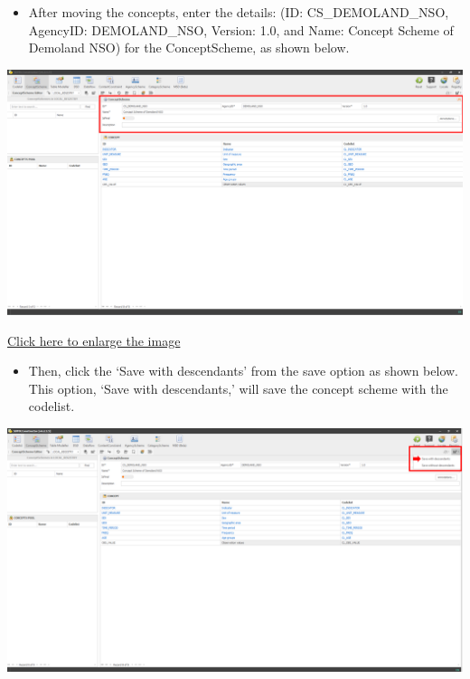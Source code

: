 \documentclass[
]{book}
\providecommand{\tightlist}{%
  \setlength{\itemsep}{0pt}\setlength{\parskip}{0pt}}
\begin{document}
\begin{itemize}
\tightlist
\item
  After moving the concepts, enter the details: (ID: CS\_DEMOLAND\_NSO, AgencyID: DEMOLAND\_NSO, Version: 1.0, and Name: Concept Scheme of Demoland NSO) for the ConceptScheme, as shown below.
\end{itemize}

\begin{center}\includegraphics[width=1\linewidth]{./images/image116} \end{center}

\href{images/image116.png}{Click here to enlarge the image}

\begin{itemize}
\tightlist
\item
  Then, click the `Save with descendants' from the save option as shown below. This option, `Save with descendants,' will save the concept scheme with the codelist.
\end{itemize}

\begin{center}\includegraphics[width=1\linewidth]{./images/image118} \end{center}
\end{document}
